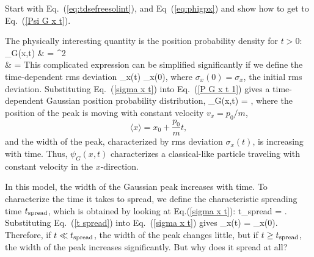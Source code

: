 \begin{exercise}
Start with Eq.~(\ref{eq:tdsefreesolint}), and Eq~(\ref{eq:phigpx}) and show how to get to Eq.~(\ref{Psi  G x t}).
\end{exercise}

The physically interesting quantity is the position probability density for $t >0$: 
%
\bas
\Pd_{G}(x,t) & =  ^{2}  \\
& = 
\exp{}
\label{P G x t 1}
\eas
%
This complicated expression can be simplified significantly if we define the time-dependent rms deviation
%
\beq
\sigma_{x}(t) \equiv \sigma_{x}(0),
\label{sigma x t}
\eeq
%
where $\sigma_{x}(0) = \sigma_{x}$, the initial rms deviation.  Substituting Eq.~(\ref{sigma x t}) into Eq.~(\ref{P G x t 1}) gives a time-dependent Gaussian position probability distribution,
%
\beq
\Pd_{G}(x,t) =  \exp{}, 
\eeq
%
where the position of the peak is moving with constant velocity  $v_{x} = p_{0}/m$,
%
\begin{equation}
\langle x \rangle = x_{0} + \frac{p_{0}}{m}t,
\end{equation}
%
and the width of the peak, characterized by  rms deviation $\sigma_{x}(t)$, is increasing with time.  Thus, $\psi_{G}(x,t)$ characterizes a classical-like particle traveling with constant velocity in the $x$-direction.

In this model, the width of the Gaussian peak increases with time.  To characterize the time it takes to spread, we define the characteristic spreading time $t_{\rm spread}$, which is obtained by looking at Eq.(\ref{sigma x t}):
%
\beq
t_{\rm spread} \equiv {} = .
\label{t spread}
\eeq
%
Substituting Eq.~(\ref{t spread}) into Eq.~(\ref{sigma x t}) gives
%
\beq
\sigma_{x}(t) = \sigma_{x}(0).
\label{sigma x t spread}
\eeq
%
Therefore, if $t \ll t_{\rm spread}$, the width of the peak changes little, but if $t \geq t_{\rm spread}$, the width of the peak increases significantly.  But why does it spread at all? 

